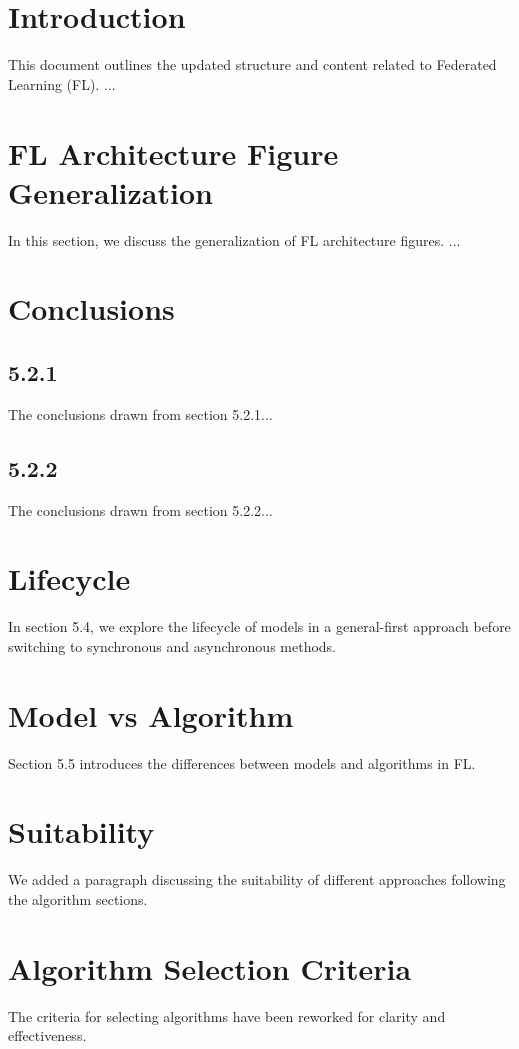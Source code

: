 \documentclass{article}
\begin{document}
\section{Introduction}
This document outlines the updated structure and content related to Federated Learning (FL).
...
\section{FL Architecture Figure Generalization}
In this section, we discuss the generalization of FL architecture figures.
...
\section{Conclusions}
\subsection{5.2.1}
The conclusions drawn from section 5.2.1...
\subsection{5.2.2}
The conclusions drawn from section 5.2.2...
\section{Lifecycle}
In section 5.4, we explore the lifecycle of models in a general-first approach before switching to synchronous and asynchronous methods.
\section{Model vs Algorithm}
Section 5.5 introduces the differences between models and algorithms in FL.
\section{Suitability}
We added a paragraph discussing the suitability of different approaches following the algorithm sections.
\section{Algorithm Selection Criteria}
The criteria for selecting algorithms have been reworked for clarity and effectiveness.
\end{document}
